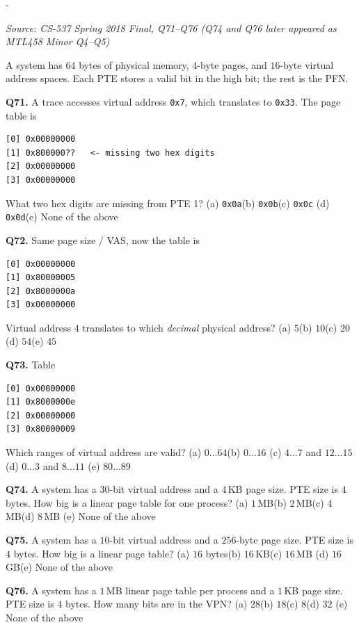 \documentclass[11pt,a4paper]{article}
\makeatletter
\newcommand{\keepspace}[1]{\par\penalty-100\begingroup
  \setlength{\dimen@}{#1}\dimen@ii\pagegoal\advance\dimen@ii-\pagetotal
  \ifdim\dimen@>\dimen@ii\ifdim\dimen@ii>\z@\vfil\fi\break\fi\endgroup}
\newcounter{qn}[section]
\newenvironment{Qn}[4]{%
  \refstepcounter{qn}\keepspace{7\baselineskip}%
  \begin{tcolorbox}[qboxstyle, title={Q\thesection.\theqn\ \ [#1 \textbar\ #2]\ \ #4}]%
  {\footnotesize\color{g3}\textit{Source: #3}}\par\smallskip%
}{%
  \end{tcolorbox}%
}
\makeatother
\begin{document}
\begin{Qn}{Hard}{Lect 12}{CS-537 Spring 2018 Final, Q71--Q76 (Q74 and Q76 later appeared as MTL458 Minor Q4--Q5)}{Linear page-table forensics: tiny translations and PT-size arithmetic}
A system has $64$ bytes of physical memory, $4$-byte pages, and
$16$-byte virtual address spaces. Each PTE stores a valid bit in the
high bit; the rest is the PFN.

\textbf{Q71.} A trace accesses virtual address \texttt{0x7}, which
translates to \texttt{0x33}. The page table is
\begin{lstlisting}[numbers=none]
[0] 0x00000000
[1] 0x800000??   <- missing two hex digits
[2] 0x00000000
[3] 0x00000000
\end{lstlisting}
What two hex digits are missing from PTE 1?
(a) \texttt{0x0a}\quad (b) \texttt{0x0b}\quad (c) \texttt{0x0c}\quad
(d) \texttt{0x0d}\quad (e) None of the above

\textbf{Q72.} Same page size / VAS, now the table is
\begin{lstlisting}[numbers=none]
[0] 0x00000000
[1] 0x80000005
[2] 0x8000000a
[3] 0x00000000
\end{lstlisting}
Virtual address $4$ translates to which \emph{decimal} physical
address?
(a) $5$\quad (b) $10$\quad (c) $20$\quad (d) $54$\quad (e) $45$

\textbf{Q73.} Table
\begin{lstlisting}[numbers=none]
[0] 0x00000000
[1] 0x8000000e
[2] 0x00000000
[3] 0x80000009
\end{lstlisting}
Which ranges of virtual address are valid?
(a) $0\ldots 64$\quad (b) $0\ldots 16$\quad
(c) $4\ldots 7$ and $12\ldots 15$\quad
(d) $0\ldots 3$ and $8\ldots 11$\quad
(e) $80\ldots 89$

\textbf{Q74.} A system has a $30$-bit virtual address and a $4$\,KB
page size. PTE size is $4$ bytes. How big is a linear page table for
one process?
(a) $1$\,MB\quad (b) $2$\,MB\quad (c) $4$\,MB\quad (d) $8$\,MB\quad
(e) None of the above

\textbf{Q75.} A system has a $10$-bit virtual address and a $256$-byte
page size. PTE size is $4$ bytes. How big is a linear page table?
(a) $16$ bytes\quad (b) $16$\,KB\quad (c) $16$\,MB\quad
(d) $16$\,GB\quad (e) None of the above

\textbf{Q76.} A system has a $1$\,MB linear page table per process and
a $1$\,KB page size. PTE size is $4$ bytes. How many bits are in the
VPN?
(a) $28$\quad (b) $18$\quad (c) $8$\quad (d) $32$\quad
(e) None of the above
\end{Qn}
\end{document}

